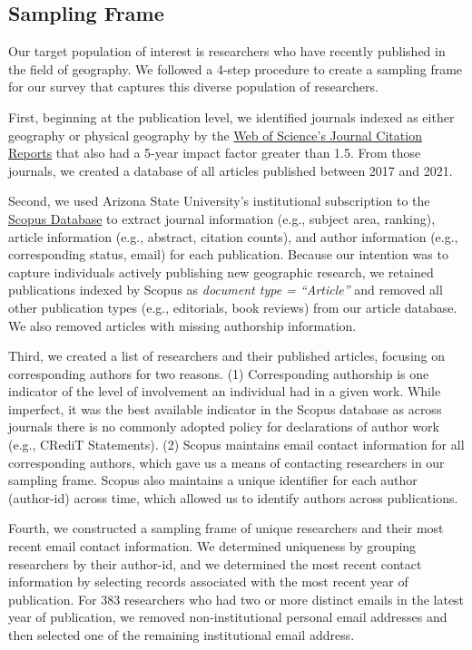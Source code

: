\documentclass[]{interact}
\theoremstyle{plain}%
\theoremstyle{definition}
\theoremstyle{remark}
\begin{document}
\subsection*{Sampling Frame}
Our target population of interest is researchers who have recently published in the field of geography. 
We followed a 4-step procedure to create a sampling frame for our survey that captures this diverse population of researchers. 

First, beginning at the publication level, we identified journals indexed as either geography or physical geography by the \href{https://access.clarivate.com/}{Web of Science's Journal Citation Reports} that also had a 5-year impact factor greater than 1.5.
From those journals, we created a database of all articles published between 2017 and 2021.  

Second, we used Arizona State University's institutional subscription to the \href{https://www.scopus.com/home.uri}{Scopus Database} to extract journal information (e.g., subject area, ranking), article information (e.g., abstract, citation counts), and author information (e.g., corresponding status, email) for each publication. 
Because our intention was to capture individuals actively publishing new geographic research, we retained publications indexed by Scopus as \textit{document type = ``Article''} and removed all other publication types (e.g., editorials, book reviews) from our article database. 
We also removed articles with missing authorship information. 

Third, we created a list of researchers and their published articles, focusing on corresponding authors for two reasons.
(1) Corresponding authorship is one indicator of the level of involvement an individual had in a given work. 
While imperfect, it was the best available indicator in the Scopus database as across journals there is no commonly adopted policy for declarations of author work (e.g., CRediT Statements).
(2) Scopus maintains email contact information for all corresponding authors, which gave us a means of contacting researchers in our sampling frame.
Scopus also maintains a unique identifier for each author (author-id) across time, which allowed us to identify authors across publications. 

Fourth, we constructed a sampling frame of unique researchers and their most recent email contact information. 
We determined uniqueness by grouping researchers by their author-id, and we determined the most recent contact information by selecting records associated with the most recent year of publication. 
For 383 researchers who had two or more distinct emails in the latest year of publication, we removed non-institutional personal email addresses and then selected one of the remaining institutional email address.
\end{document}
